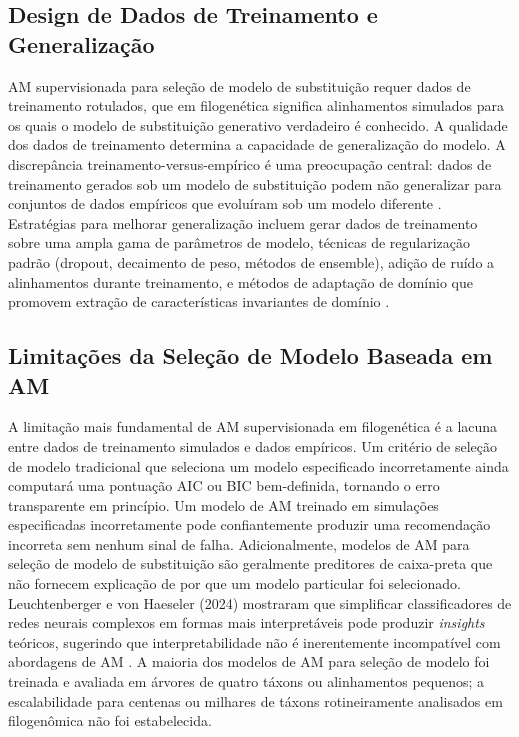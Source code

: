 \subsection{Design de Dados de Treinamento e Generalização}

AM supervisionada para seleção de modelo de substituição requer dados de treinamento rotulados, que em filogenética significa alinhamentos simulados para os quais o modelo de substituição generativo verdadeiro é conhecido. A qualidade dos dados de treinamento determina a capacidade de generalização do modelo. A discrepância treinamento-versus-empírico é uma preocupação central: dados de treinamento gerados sob um modelo de substituição podem não generalizar para conjuntos de dados empíricos que evoluíram sob um modelo diferente \parencite{mo2024}. Estratégias para melhorar generalização incluem gerar dados de treinamento sobre uma ampla gama de parâmetros de modelo, técnicas de regularização padrão (dropout, decaimento de peso, métodos de ensemble), adição de ruído a alinhamentos durante treinamento, e métodos de adaptação de domínio que promovem extração de características invariantes de domínio \parencite{mosiepel2024}.

\subsection{Limitações da Seleção de Modelo Baseada em AM}

A limitação mais fundamental de AM supervisionada em filogenética é a lacuna entre dados de treinamento simulados e dados empíricos. Um critério de seleção de modelo tradicional que seleciona um modelo especificado incorretamente ainda computará uma pontuação AIC ou BIC bem-definida, tornando o erro transparente em princípio. Um modelo de AM treinado em simulações especificadas incorretamente pode confiantemente produzir uma recomendação incorreta sem nenhum sinal de falha. Adicionalmente, modelos de AM para seleção de modelo de substituição são geralmente preditores de caixa-preta que não fornecem explicação de por que um modelo particular foi selecionado. Leuchtenberger e von Haeseler (2024) mostraram que simplificar classificadores de redes neurais complexos em formas mais interpretáveis pode produzir \textit{insights} teóricos, sugerindo que interpretabilidade não é inerentemente incompatível com abordagens de AM \parencite{leuchtenberger2024}. A maioria dos modelos de AM para seleção de modelo foi treinada e avaliada em árvores de quatro táxons ou alinhamentos pequenos; a escalabilidade para centenas ou milhares de táxons rotineiramente analisados em filogenômica não foi estabelecida.

